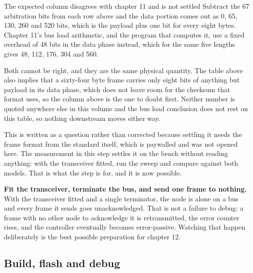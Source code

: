 \begin{steps}
\begin{note}{The expected column disagrees with chapter 11 and is not settled}
Subtract the 67 arbitration bits from each row above and the data portion comes
out as 0, 65, 130, 260 and 520 bits, which is the payload plus one bit for every
eight bytes. Chapter 11's bus load arithmetic, and the program that computes it,
use a fixed overhead of 48 bits in the data phase instead, which for the same
five lengths gives 48, 112, 176, 304 and 560.

\par\medskip Both cannot be right, and they are the same physical quantity. The
table above also implies that a sixty-four byte frame carries only eight bits of
anything but payload in its data phase, which does not leave room for the
checksum that format uses, so the column above is the one to doubt first.
Neither number is quoted anywhere else in this volume and the bus load
conclusion does not rest on this table, so nothing downstream moves either way.

\par\medskip This is written as a question rather than corrected because
settling it needs the frame format from the standard itself, which is paywalled
and was not opened here. The measurement in this step settles it on the bench
without reading anything: with the transceiver fitted, run the sweep and compare
against both models. That is what the step is for, and it is now possible.
\end{note}

\item \textbf{Fit the transceiver, terminate the bus, and send one frame to
nothing.} With the transceiver fitted and a single terminator, the node is alone
on a bus and every frame it sends goes unacknowledged. That is not a failure to
debug: a frame with no other node to acknowledge it is retransmitted, the error
counter rises, and the controller eventually becomes error-passive. Watching
that happen deliberately is the best possible preparation for chapter 12.
\end{steps}

\subsection*{Build, flash and debug}


